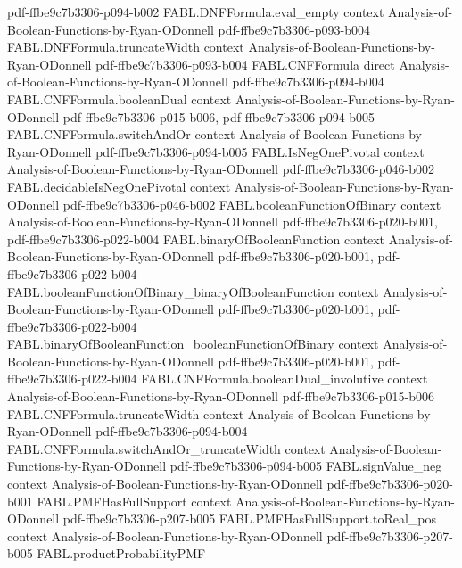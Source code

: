 \begin{theorem}
  {pdf-ffbe9c7b3306-p094-b002}
\proofstep
  {FABL.DNFFormula.eval_empty}
  {context}
  {Analysis-of-Boolean-Functions-by-Ryan-ODonnell}
  {pdf-ffbe9c7b3306-p093-b004}
\proofstep
  {FABL.DNFFormula.truncateWidth}
  {context}
  {Analysis-of-Boolean-Functions-by-Ryan-ODonnell}
  {pdf-ffbe9c7b3306-p093-b004}
\proofstep
  {FABL.CNFFormula}
  {direct}
  {Analysis-of-Boolean-Functions-by-Ryan-ODonnell}
  {pdf-ffbe9c7b3306-p094-b004}
\proofstep
  {FABL.CNFFormula.booleanDual}
  {context}
  {Analysis-of-Boolean-Functions-by-Ryan-ODonnell}
  {pdf-ffbe9c7b3306-p015-b006,
    pdf-ffbe9c7b3306-p094-b005}
\proofstep
  {FABL.CNFFormula.switchAndOr}
  {context}
  {Analysis-of-Boolean-Functions-by-Ryan-ODonnell}
  {pdf-ffbe9c7b3306-p094-b005}
\proofstep
  {FABL.IsNegOnePivotal}
  {context}
  {Analysis-of-Boolean-Functions-by-Ryan-ODonnell}
  {pdf-ffbe9c7b3306-p046-b002}
\proofstep
  {FABL.decidableIsNegOnePivotal}
  {context}
  {Analysis-of-Boolean-Functions-by-Ryan-ODonnell}
  {pdf-ffbe9c7b3306-p046-b002}
\proofstep
  {FABL.booleanFunctionOfBinary}
  {context}
  {Analysis-of-Boolean-Functions-by-Ryan-ODonnell}
  {pdf-ffbe9c7b3306-p020-b001,
    pdf-ffbe9c7b3306-p022-b004}
\proofstep
  {FABL.binaryOfBooleanFunction}
  {context}
  {Analysis-of-Boolean-Functions-by-Ryan-ODonnell}
  {pdf-ffbe9c7b3306-p020-b001,
    pdf-ffbe9c7b3306-p022-b004}
\proofstep
  {FABL.booleanFunctionOfBinary_binaryOfBooleanFunction}
  {context}
  {Analysis-of-Boolean-Functions-by-Ryan-ODonnell}
  {pdf-ffbe9c7b3306-p020-b001,
    pdf-ffbe9c7b3306-p022-b004}
\proofstep
  {FABL.binaryOfBooleanFunction_booleanFunctionOfBinary}
  {context}
  {Analysis-of-Boolean-Functions-by-Ryan-ODonnell}
  {pdf-ffbe9c7b3306-p020-b001,
    pdf-ffbe9c7b3306-p022-b004}
\proofstep
  {FABL.CNFFormula.booleanDual_involutive}
  {context}
  {Analysis-of-Boolean-Functions-by-Ryan-ODonnell}
  {pdf-ffbe9c7b3306-p015-b006}
\proofstep
  {FABL.CNFFormula.truncateWidth}
  {context}
  {Analysis-of-Boolean-Functions-by-Ryan-ODonnell}
  {pdf-ffbe9c7b3306-p094-b004}
\proofstep
  {FABL.CNFFormula.switchAndOr_truncateWidth}
  {context}
  {Analysis-of-Boolean-Functions-by-Ryan-ODonnell}
  {pdf-ffbe9c7b3306-p094-b005}
\proofstep
  {FABL.signValue_neg}
  {context}
  {Analysis-of-Boolean-Functions-by-Ryan-ODonnell}
  {pdf-ffbe9c7b3306-p020-b001}
\proofstep
  {FABL.PMFHasFullSupport}
  {context}
  {Analysis-of-Boolean-Functions-by-Ryan-ODonnell}
  {pdf-ffbe9c7b3306-p207-b005}
\proofstep
  {FABL.PMFHasFullSupport.toReal_pos}
  {context}
  {Analysis-of-Boolean-Functions-by-Ryan-ODonnell}
  {pdf-ffbe9c7b3306-p207-b005}
\proofstep
  {FABL.productProbabilityPMF}

\end{theorem}

